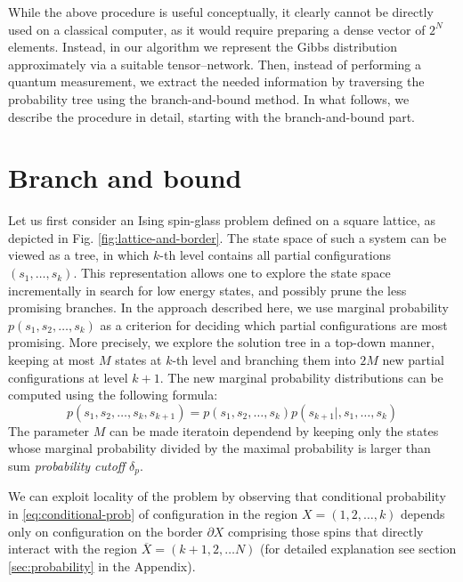 While the above procedure is useful conceptually, it clearly cannot be directly
used on a classical computer, as it would require preparing a dense vector of
$2^{N}$ elements. Instead, in our algorithm we represent the Gibbs distribution
approximately via a suitable tensor--network. Then, instead of performing a
quantum measurement, we extract the needed information by traversing the
probability tree using the branch-and-bound method. In what follows, we
describe the procedure in detail, starting with the branch-and-bound
part.

\section{Branch and bound}
Let us first consider an Ising spin-glass problem defined on a square lattice,
as depicted in Fig. \ref{fig:lattice-and-border}. The state space of such a
system can be viewed as a tree, in which $k$-th level contains all partial
configurations $(s_1, \ldots, s_k)$. This representation allows one to explore
the state space incrementally in search for low energy states, and possibly
prune the less promising branches. In the approach described here, we use
marginal probability $p(s_1, s_2, \ldots, s_k)$ as a criterion for deciding
which partial configurations are most promising. More precisely, we explore the
solution tree in a top-down manner, keeping at most $M$ states at $k$-th level
and branching them into $2M$ new partial configurations at level $k+1$. The
new marginal probability distributions can be computed using the following formula:
\begin{equation}
  \label{eq:conditional-prob}
  p(s_1, s_2, \ldots, s_k, s_{k+1}) = p(s_1, s_2, \ldots, s_k)p(s_{k+1}|, s_1, \ldots, s_k)
\end{equation}
The parameter $M$ can be made iteratoin dependend by keeping only the states
whose marginal probability divided by the maximal probability is larger than
sum \emph{probability cutoff} $\delta_{p}$.

We can exploit locality of the problem by observing that conditional
probability in \eqref{eq:conditional-prob} of configuration in the region $X =
  (1, 2, \ldots, k)$ depends only on configuration on the border $\partial X$ comprising those spins that directly interact with the region
$\overline{X} = (k+1, 2, \ldots N)$ (for detailed explanation see section
\ref{sec:probability} in the Appendix).

